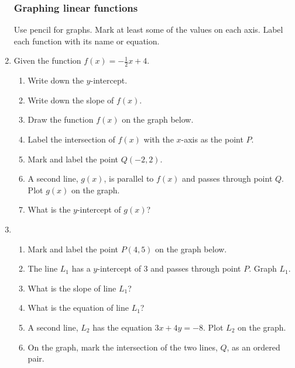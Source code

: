 \documentclass[12pt, oneside]{article}
\begin{document}
\begin{enumerate}
\subsubsection*{Graphing linear functions}
Use pencil for graphs. Mark at least some of the values on each axis. Label each function with its name or equation.
\item Given the function $f(x)=-\frac{1}{2}x+4$.
\begin{enumerate}
    \item Write down the $y$-intercept. \bigskip
    \item Write down the slope of $f(x)$. \bigskip
    \item Draw the function $f(x)$ on the graph below.
    \item Label the intersection of $f(x)$ with the $x$-axis as the point $P$.
    \item Mark and label the point $Q (-2, 2)$.
    \item A second line, $g(x)$, is parallel to $f(x)$ and passes through point $Q$. Plot $g(x)$ on the graph.
    \item What is the $y$-intercept of $g(x)$? \bigskip
\end{enumerate}

\begin{center} %
\end{center}

\newpage
\item
  \begin{enumerate}
    \item Mark and label the point $P(4, 5)$ on the graph below.
    \item The line $L_1$ has a $y$-intercept of 3 and passes through point $P$. Graph $L_1$.
    \item What is the slope of line $L_1$? \vspace{2cm}
    \item What is the equation of line $L_1$? \vspace{2cm}
    \item A second line, $L_2$ has the equation $3x+4y=-8$. Plot $L_2$ on the graph.
    \item On the graph, mark the intersection of the two lines, $Q$, as an ordered pair.
  \end{enumerate}


\end{enumerate}
\end{document}
